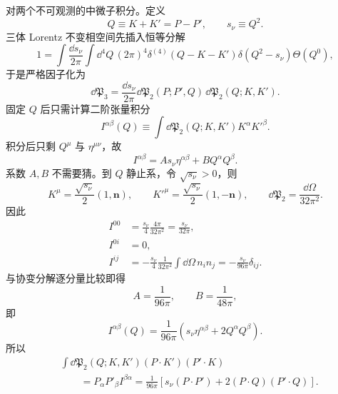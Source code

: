 \begin{derivation}[缪子衰变的自旋求和与三体相空间]
对两个不可观测的中微子积分。定义
\begin{equation*}
Q\equiv K+K'=P-P',\qquad s_\nu\equiv Q^2.
\end{equation*}
三体 Lorentz 不变相空间先插入恒等分解
\[
1=\int\frac{\dd s_\nu}{2\pi}
\int\dd^4Q\,(2\pi)^4
\delta^{(4)}(Q-K-K')\delta(Q^2-s_\nu)\Theta(Q^0),
\]
于是严格因子化为
\begin{equation*}
\dd\mathfrak P_3
=\frac{\dd s_\nu}{2\pi}
\dd\mathfrak P_2(P;P',Q)\,
\dd\mathfrak P_2(Q;K,K').
\end{equation*}
固定 $Q$ 后只需计算二阶张量积分
\begin{equation*}
I^{\alpha\beta}(Q)
\equiv\int\dd\mathfrak P_2(Q;K,K')K^\alpha K'^\beta.
\end{equation*}
积分后只剩 $Q^\mu$ 与 $\eta^{\mu\nu}$，故
\begin{equation*}
I^{\alpha\beta}=A s_\nu\eta^{\alpha\beta}+B Q^\alpha Q^\beta.
\end{equation*}
系数 $A,B$ 不需要猜。到 $Q$ 静止系，令 $\sqrt{s_\nu}>0$，则
\begin{equation*}
K^\mu=\frac{\sqrt{s_\nu}}2(1,\mathbf n),\qquad
K'^\mu=\frac{\sqrt{s_\nu}}2(1,-\mathbf n),\qquad
\dd\mathfrak P_2=\frac{\dd\Omega}{32\pi^2}.
\end{equation*}
因此
\begin{align*}
I^{00}
&=\frac{s_\nu}{4}\frac{4\pi}{32\pi^2}
=\frac{s_\nu}{32\pi},\\
I^{0i}&=0,\\
I^{ij}
&=-\frac{s_\nu}{4}\frac{1}{32\pi^2}
\int\dd\Omega\,n_in_j
=-\frac{s_\nu}{96\pi}\delta_{ij}.
\end{align*}
与协变分解逐分量比较即得
\begin{equation*}
A=\frac1{96\pi},\qquad B=\frac1{48\pi},
\end{equation*}
即
\begin{equation*}
I^{\alpha\beta}(Q)
=\frac{1}{96\pi}
\left(s_\nu\eta^{\alpha\beta}+2Q^\alpha Q^\beta\right).
\end{equation*}
所以
\begin{align*}
&\int\dd\mathfrak P_2(Q;K,K')
(P\!\cdot K')(P'\!\cdot K)\\
&\qquad=P_\alpha P'_\beta I^{\beta\alpha}
=\frac{1}{96\pi}
\left[s_\nu(P\!\cdot P')+2(P\!\cdot Q)(P'\!\cdot Q)\right].
\end{align*}


\end{derivation}
